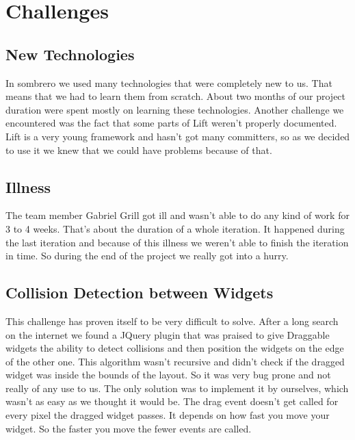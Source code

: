 \section{Challenges}
\subsection{New Technologies}
    In sombrero we used many technologies that were completely new to us. That means that we had to learn them from scratch. About two months of our project duration were spent mostly on learning these technologies. Another challenge we encountered was the fact that some parts of Lift weren't properly documented. Lift is a very young framework and hasn't got many committers, so as we decided to use it we knew that we could have problems because of that.
\subsection{Illness}
    The team member Gabriel Grill got ill and wasn't able to do any kind of work for 3 to 4 weeks. That's about the duration of a whole iteration. It happened during the last iteration and because of this illness we weren't able to finish the iteration in time. So during the end of the project we really got into a hurry.
\subsection{Collision Detection between Widgets}
    This challenge has proven itself to be very difficult to solve. After a long search on the internet we found a JQuery plugin that was praised to give Draggable widgets the ability to detect collisions and then position the widgets on the edge of the other one. This algorithm wasn't recursive and didn't check if the dragged widget was inside the bounds of the layout. So it was very bug prone and not really of any use to us. The only solution was to implement it by ourselves, which wasn't as easy as we thought it would be. The drag event doesn't get called for every pixel the dragged widget passes. It depends on how fast you move your widget. So the faster you move the fewer events are called.

